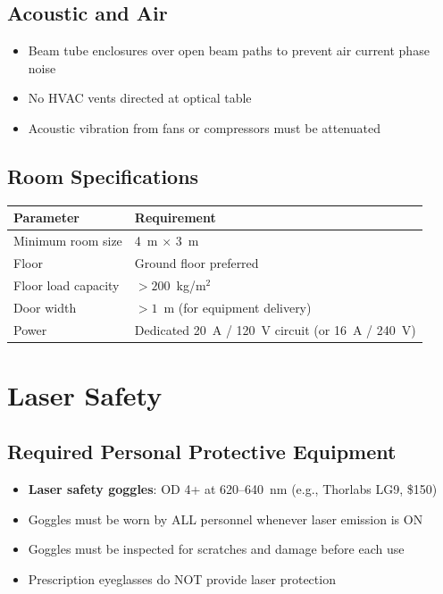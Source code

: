 \documentclass[11pt,a4paper,openany]{book}
\begin{document}
\subsection{Acoustic and Air}

\begin{itemize}[nosep]
  \item Beam tube enclosures over open beam paths to prevent air current phase noise
  \item No HVAC vents directed at optical table
  \item Acoustic vibration from fans or compressors must be attenuated
\end{itemize}

\subsection{Room Specifications}

\begin{center}
\begin{tabular}{ll}
\toprule
\textbf{Parameter} & \textbf{Requirement} \\
\midrule
Minimum room size & 4~m $\times$ 3~m \\
Floor & Ground floor preferred \\
Floor load capacity & $> 200$~kg/m$^2$ \\
Door width & $> 1$~m (for equipment delivery) \\
Power & Dedicated 20~A / 120~V circuit (or 16~A / 240~V) \\
\bottomrule
\end{tabular}
\end{center}

\section{Laser Safety}


\subsection{Required Personal Protective Equipment}

\begin{itemize}[nosep]
  \item \textbf{Laser safety goggles}: OD 4+ at 620--640~nm (e.g., Thorlabs LG9, \$150)
  \item Goggles must be worn by ALL personnel whenever laser emission is ON
  \item Goggles must be inspected for scratches and damage before each use
  \item Prescription eyeglasses do NOT provide laser protection
\end{itemize}
\end{document}
